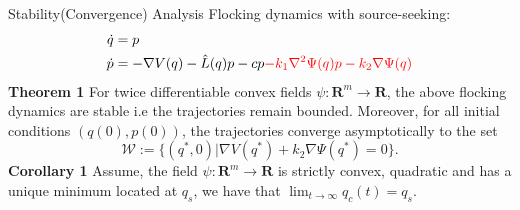 \begin{frame}{Stability(Convergence) Analysis}
	Flocking dynamics with source-seeking:
	\begin{equation*}
	\begin{split}
	\Dot{q}&=p\\
	\Dot{p}&=-\nabla V(q)-\hat{L}(q)p -cp\textcolor{red}{-k_1\nabla^2 \Psi(q) p -k_2 \nabla \Psi(q)}
	\end{split}
	\end{equation*}
\textbf{Theorem 1} For twice differentiable convex fields $\psi:\mathbf{R}^m \xrightarrow{} \mathbf{R}$, the above flocking dynamics are stable i.e the trajectories remain bounded. Moreover, for all initial conditions $(q(0),p(0))$, the trajectories converge asymptotically to the set $$\mathcal{W}:=\{(q^*,0)|\nabla V (q^*)+ k_2\nabla\Psi(q^*) = 0 \}.$$
\textbf{Corollary 1} Assume, the field $\psi:\mathbf{R}^m \xrightarrow{} \mathbf{R}$ is strictly convex, quadratic and has a unique minimum located at $q_s$, we have that $\lim_{t\rightarrow \infty}q_c(t)=q_s$.

\end{frame}
